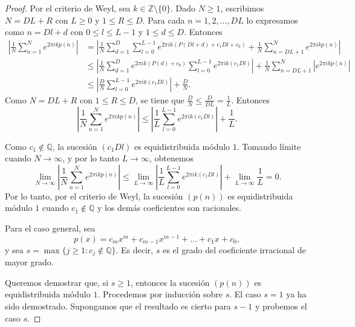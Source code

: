 \begin{proof}
    Por el criterio de Weyl, sea $k \in \mathbb{Z}\setminus\{0\}$. Dado $N \geq 1$, 
    escribimos $N=DL+R$ con $L \geq 0$ y $1 \leq R \leq D$. Para cada $n=1,2,\dots,DL$
    lo expresamos como $n= Dl + d$ con $0 \leq l \leq L-1$ y $1 \leq d \leq D$. 
    Entonces
    \begin{align*}
        \left|\frac{1}{N}\sum_{n=1}^N e^{2\pi i k p(n)} \right|
        &= \left|\frac{1}{N}\sum_{d=1}^D \sum_{l=0}^{L-1} e^{2\pi i k(P(Dl+d) + c_1 Dl + c_0)} + \frac{1}{N}\sum_{n=DL+1}^N e^{2\pi i k p(n)} \right| \\
        &\leq \left|\frac{1}{N}\sum_{d=1}^D e^{2\pi i k(P(d) + c_0)} \sum_{l=0}^{L-1} e^{2\pi i k (c_1 Dl)}\right| + \frac{1}{N}\sum_{n=DL+1}^N \left|e^{2\pi i k p(n)}\right| \\
        &\leq \left|\frac{D}{N} \sum_{l=0}^{L-1} e^{2\pi i k (c_1 Dl)}\right| + \frac{D}{N}.
    \end{align*}
    Como $N=DL+R$ con $1 \leq R \leq D$, se tiene que $\frac{D}{N} \leq \frac{D}{DL} = \frac{1}{L}$. Entonces
    \[
        \left|\frac{1}{N}\sum_{n=1}^N e^{2\pi i k p(n)} \right| \leq 
        \left|\frac{1}{L} \sum_{l=0}^{L-1} e^{2\pi i k (c_1 Dl)}\right| + \frac{1}{L}.
    \]

    Como $c_1 \notin \mathbb{Q}$, la sucesión $(c_1 Dl)$ es equidistribuida módulo $1$.
    Tomando límite cuando $N \to \infty$, y por lo tanto $L \to \infty$, obtenemos
    \[
        \lim_{N \to \infty} \left|\frac{1}{N}\sum_{n=1}^N e^{2\pi i k p(n)} \right| \leq 
        \lim_{L \to \infty} \left|\frac{1}{L} \sum_{l=0}^{L-1} e^{2\pi i k (c_1 Dl)}\right| + \lim_{L \to \infty} \frac{1}{L} = 0.
    \]
    Por lo tanto, por el criterio de Weyl, la sucesión $(p(n))$ es equidistribuida módulo 
    $1$ cuando $c_1 \notin \mathbb{Q}$ y los demás coeficientes son racionales.

    Para el caso general, sea 
    \[
    p(x)=c_m x^m + c_{m-1} x^{m-1} + \dots + c_1 x + c_0,
    \]
    y sea $s = \max\{j \geq 1 : c_j \notin \mathbb{Q}\}$. Es decir, $s$ es el grado
    del coeficiente irracional de mayor grado.

    Queremos demostrar que, si $s\geq1$, entonces la sucesión $(p(n))$ es equidistribuida 
    módulo $1$. Procedemos por inducción sobre $s$. El caso $s=1$ ya ha sido demostrado.
    Supongamos que el resultado es cierto para $s-1$ y probemos el caso $s$.


\end{proof}
